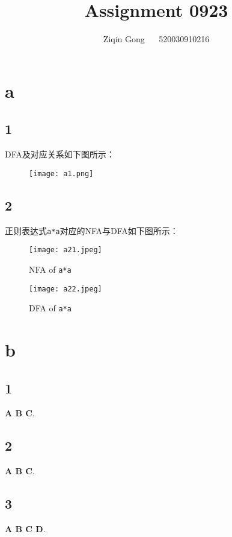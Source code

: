 \documentclass[12pt]{article}
\title{Assignment 0923}
\author{Ziqin Gong $\quad$ 520030910216}
\date{}
\begin{document}
  \maketitle

  \section{a}

  \subsection{1}

    DFA及对应关系如下图所示：
    \vspace{-10pt}

    \begin{figure}[!htp]
      \centering
      \texttt{[image: a1.png]}
    \end{figure}

    \vspace{-30pt}

  \subsection{2}

    正则表达式\texttt{a*a}对应的NFA与DFA如下图所示：

    \begin{figure}[!htp]
      \centering
      \begin{minipage}{0.48\linewidth}
        \centering
        \texttt{[image: a21.jpeg]}
        \caption{NFA of \texttt{a*a}}
      \end{minipage}
      \begin{minipage}{0.48\linewidth}
        \centering
        \texttt{[image: a22.jpeg]}
        \caption{DFA of \texttt{a*a}}
      \end{minipage}
    \end{figure}

  \section{b}

  \subsection{1}

  \textbf{A B C}.

  \subsection{2}

  \textbf{A B C}.

  \subsection{3}

  \textbf{A B C D}.
\end{document}
